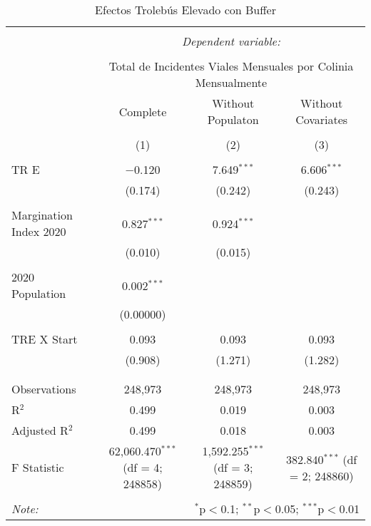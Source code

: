 
\begin{table}[!htbp] \centering 
  \caption{Efectos Trolebús Elevado con Buffer} 
  \label{} 
\begin{tabular}{@{\extracolsep{5pt}}lccc} 
\\[-1.8ex]\hline 
\hline \\[-1.8ex] 
 & \multicolumn{3}{c}{\textit{Dependent variable:}} \\ 
\cline{2-4} 
\\[-1.8ex] & \multicolumn{3}{c}{Total de Incidentes Viales Mensuales por Colinia Mensualmente} \\ 
 & Complete & Without Populaton & Without Covariates \\ 
\\[-1.8ex] & (1) & (2) & (3)\\ 
\hline \\[-1.8ex] 
 TR E & $-$0.120 & 7.649$^{***}$ & 6.606$^{***}$ \\ 
  & (0.174) & (0.242) & (0.243) \\ 
  & & & \\ 
 Margination Index 2020 & 0.827$^{***}$ & 0.924$^{***}$ &  \\ 
  & (0.010) & (0.015) &  \\ 
  & & & \\ 
 2020 Population & 0.002$^{***}$ &  &  \\ 
  & (0.00000) &  &  \\ 
  & & & \\ 
 TRE X Start & 0.093 & 0.093 & 0.093 \\ 
  & (0.908) & (1.271) & (1.282) \\ 
  & & & \\ 
\hline \\[-1.8ex] 
Observations & 248,973 & 248,973 & 248,973 \\ 
R$^{2}$ & 0.499 & 0.019 & 0.003 \\ 
Adjusted R$^{2}$ & 0.499 & 0.018 & 0.003 \\ 
F Statistic & 62,060.470$^{***}$ (df = 4; 248858) & 1,592.255$^{***}$ (df = 3; 248859) & 382.840$^{***}$ (df = 2; 248860) \\ 
\hline 
\hline \\[-1.8ex] 
\textit{Note:}  & \multicolumn{3}{r}{$^{*}$p$<$0.1; $^{**}$p$<$0.05; $^{***}$p$<$0.01} \\ 
\end{tabular} 
\end{table} 
